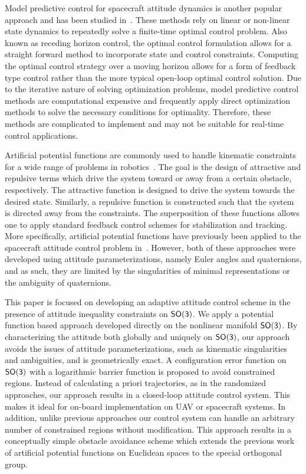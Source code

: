 \documentclass[10pt,fleqn]{IJCAS}  %
\begin{document}
\begin{multicols}{2}
Model predictive control for spacecraft attitude dynamics is another popular approach and has been studied in~\cite{guiggiani2014,kalabic2014,gupta2015}.
These methods rely on linear or non-linear state dynamics to repeatedly solve a finite-time optimal control problem.
Also known as receding horizon control, the optimal control formulation allows for a straight forward method to incorporate state and control constraints.
Computing the optimal control strategy over a moving horizon allows for a form of feedback type control rather than the more typical open-loop optimal control solution.
Due to the iterative nature of solving optimization problems, model predictive control methods are computational expensive and frequently apply direct optimization methods to solve the necessary conditions for optimality.
Therefore, these methods are complicated to implement and may not be suitable for real-time control applications.
  
Artificial potential functions are commonly used to handle kinematic constraints for a wide range of problems in robotics~\cite{rimon1992}.
The goal is the design of attractive and repulsive terms which drive the system toward or away from a certain obstacle, respectively.
The attractive function is designed to drive the system towards the desired state.
Similarly, a repulsive function is constructed such that the system is directed away from the constraints. 
The superposition of these functions allows one to apply standard feedback control schemes for stabilization and tracking.
More specifically, artificial potential functions have previously been applied to the spacecraft attitude control problem in~\cite{lee2011b,mcinnes1994}.
However, both of these approaches were developed using attitude parameterizations, namely Euler angles and quaternions, and as such, they are limited by the singularities of minimal representations or the ambiguity of quaternions.

This paper is focused on developing an adaptive attitude control scheme in the presence of attitude inequality constraints on \(\mathsf{SO(3)}\).
We apply a potential function based approach developed directly on the nonlinear manifold \(\mathsf{SO(3)}\). 
By characterizing the attitude both globally and uniquely on \(\mathsf{SO(3)}\), our approach avoids the issues of attitude parameterizations, such as kinematic singularities and ambiguities, and is geometrically exact. 
A configuration error function on \(\mathsf{SO(3)}\) with a logarithmic barrier function is proposed to avoid constrained regions. 
Instead of calculating a priori trajectories, as in the randomized approaches, our approach results in a closed-loop attitude control system. 
This makes it ideal for on-board implementation on UAV or spacecraft systems. 
In addition, unlike previous approaches our control system can handle an arbitrary number of constrained regions without modification.
This approach results in a conceptually simple obstacle avoidance scheme which extends the previous work of artificial potential functions on Euclidean spaces to the special orthogonal group.


\end{multicols}
\end{document}
